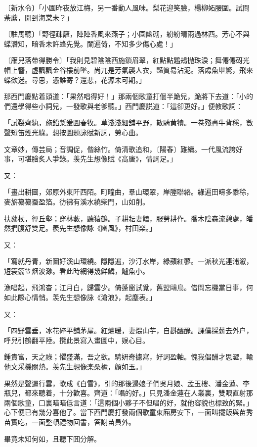 \begin{myquote}
{\markfont〔新水令〕}「小園昨夜放江梅，另一番動人風味。梨花迎笑臉，楊柳妬腰圍。試問荼䕷，開到海棠未？」

{\markfont〔駐馬聽〕}「野徑疎籬，陣陣香風來燕子；小園幽砌，紛紛晴雨過林西。芳心不與蝶潛知，暗香未許蜂先覺。闌遍倚，不知多少傷心處！」

{\markfont〔雁兒落带得勝令〕}「我則見碧陰陰西施鎖眉翠，紅點點鶗鴂抛珠淚；舞僊僊砑光帽上簪，虚飄飄金谷樓前墜。尚兀是芳氣襲人衣，豔質易沾泥。落䖏魚堪驚，飛來蝶欲迷。尋思，憑誰寄？還悲，花源未可期。」
\end{myquote}

那西門慶點着頭道：「果然唱得好！」那兩個歌童打個半跪兒，跪將下去道：「小的們還學得些小詞兒，一發歌與老爹聽。」西門慶説道：「這卻更好。」便教歌詞：

\begin{myquote}
「試裂齊紈，施鉛槧爰圖春牧。草淺淺細舖平野，散騎黄犢。一卷殘書牛背穩，數聲短笛煙光綠。想按圖題詠賦新詞，勞心曲。

文章妙，傳芸局；音調促，偕絲竹。倚清歌追和，〔陽春〕難續。一代風流誇好事，可堪膾炙人爭錄。羡先生想像賦《高唐》，情詞足。」
\end{myquote}

又：

\begin{myquote}
「畫出耕圖，郊原外東阡西陌。町疃曲，羣山環翠，岸塍聯絡。綠遍田疇多黍稌，麥旂纂纂蚕盈箔。彷彿有溪水繞柴門，山如削。

扶藜杖，徑丘壑；穿林藪，聽猿鶴。子耕耘妻饁，服勞耕作。喬木陰森流憩處，皤然捫腹舒雙足。羨先生想像詠《豳風》，村田楽。」
\end{myquote}

又：

\begin{myquote}
「寫就丹青，新圖好溪山環繞。隱隱遍，沙汀水岸，綠蘋紅蓼。一派秋光連浦溆，短簑篛笠烟波渺。看此時網得幾鮮鱗，鱸魚小。

漁唱起，飛鴻杳；江月白，歸雲少。倚蓬窗試覓，舊盟鷗鳥。借問忘機當日事，何如此際心情悄。羡先生想像詠《滄浪》，起塵表。」
\end{myquote}

又：

\begin{myquote}
「四野雲垂，冰花碎平舖茅屋。紅爐暖，妻煨山芋，自斟醽醁。課僕採薪去外户，呼兒引鶴翻平陸。攬此景寫入畫圖中，娱心目。

鍾貴富，天之祿；懼盛滿，吾之欲。騁姸奇攄寫，好詞盈軸。愧我倡酬才思澀，輸他文采機關熱。羡先生想像楽桑楡，顏如玉。」
\end{myquote}

果然是聲遏行雲，歌成《白雪》，引的那後邊娘子們吳月娘、孟玉樓、潘金蓮、李瓶兒，都來聽着，十分歡喜。齊道：「唱的好。」只見潘金蓮在人叢裏，雙眼直射那兩個歌童，口裏暗暗低言道：「這兩個小夥子不但唱的好，就他容貌也標致的緊。」心下便已有幾分喜他了。當下西門慶打發兩個歌童東廂房安下，一面叫擺飯與苗秀苗實吃，一面整頓禮物回書，答謝苗員外。

畢竟未知何如，且聽下囬分解。

